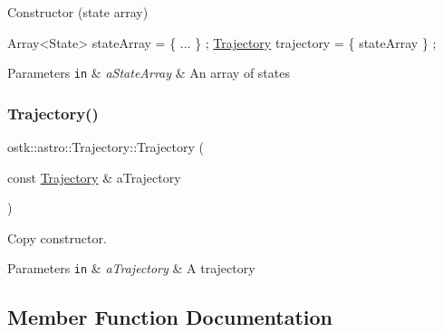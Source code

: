 Constructor (state array) 


\begin{DoxyCode}
Array<State> stateArray = \{ ... \} ;
\hyperlink{classostk_1_1astro_1_1_trajectory_a9333200bd6afed5aef4f5aad8a2a8e84}{Trajectory} trajectory = \{ stateArray \} ;
\end{DoxyCode}



\begin{DoxyParams}[1]{Parameters}
\mbox{\tt in}  & {\em a\+State\+Array} & An array of states \\
\hline
\end{DoxyParams}
\mbox{\label{classostk_1_1astro_1_1_trajectory_a2a7642fa6183da49b5def83f63f08c42}} 
\subsubsection{\texorpdfstring{Trajectory()}{Trajectory()}\hspace{0.1cm}{\footnotesize\ttfamily [3/3]}}
{\footnotesize\ttfamily ostk\+::astro\+::\+Trajectory\+::\+Trajectory (\begin{DoxyParamCaption}\item[{const \hyperlink{classostk_1_1astro_1_1_trajectory}{Trajectory} \&}]{a\+Trajectory }\end{DoxyParamCaption})}



Copy constructor. 


\begin{DoxyParams}[1]{Parameters}
\mbox{\tt in}  & {\em a\+Trajectory} & A trajectory \\
\hline
\end{DoxyParams}


\subsection{Member Function Documentation}
\mbox{\label{classostk_1_1astro_1_1_trajectory_a7a5e15ddb0b4e1a1546615840610252c}} 
